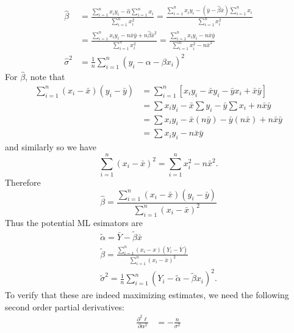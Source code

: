 \documentclass[notoc,notitlepage]{tufte-book}
\begin{document}
\begin{solution}
\begin{align*}
    \hat{\beta} &= \frac{\sum_{i=1}^{n} x_i y_i - \hat{\alpha} \sum_{i=1}^{n} x_i}{\sum_{i=1}^{n} x_i^2} = \frac{\sum_{i=1}^{n} x_i y_i - ( \bar{y} - \hat{\beta} \bar{x} ) \sum_{i=1}^{n} x_i}{\sum_{i=1}^{n} x_i^2} \\
                &= \frac{\sum_{i=1}^{n} x_i y_i - n \bar{x}\bar{y} + n \hat{\beta} \bar{x}^2}{\sum_{i=1}^{n} x_i^2} = \frac{\sum_{i=1}^{n} x_i y_i - n \bar{x}\bar{y}}{\sum_{i=1}^{n} x_i^2 - n \bar{x}^2} \\
    \hat{\sigma}^2 &= \frac{1}{n} \sum_{i=1}^{n} \left( y_i - \alpha - \beta x_i \right)^2
  \end{align*}
  For $\hat{\beta}$, note that
  \begin{align*}
    \sum_{i=1}^{n} (x_i - \bar{x})(y_i - \bar{y}) &= \sum_{i=1}^{n} \left[ x_i y_i - \bar{x} y_i - \bar{y} x_i + \bar{x}\bar{y} \right] \\
                                                  &= \sum x_i y_i - \bar{x} \sum y_i - \bar{y} \sum x_i + n \bar{x} \bar{y} \\
                                                  &= \sum x_i y_i - \bar{x} (n \bar{y}) - \bar{y} ( n \bar{x} ) + n \bar{x} \bar{y} \\
                                                  &= \sum x_i y_i - n \bar{x} \bar{y}
  \end{align*}
  and similarly so we have
  \begin{equation*}
    \sum_{i=1}^{n} (x_i - \bar{x})^2 = \sum_{i=1}^{n} x_i^2 - n \bar{x}^2.
  \end{equation*}
  Therefore
  \begin{equation*}
    \hat{\beta} = \frac{\sum_{i=1}^{n} (x_i - \bar{x})(y_i - \bar{y})}{\sum_{i=1}^{n} (x_i - \bar{x})^2}
  \end{equation*}
  Thus the potential ML esimators are
  \begin{gather*}
    \tilde{\alpha} = \bar{Y} - \tilde{\beta}\bar{x} \\
    \tilde{\beta} = \frac{\sum_{i=1}^{n} (x_i - x)(Y_i - \bar{Y})}{\sum_{i=1}^{n} (x_i - \bar{x})^2} \\
    \tilde{\sigma}^2 = \frac{1}{n} \sum_{i=1}^{n} \left( Y_i - \tilde{\alpha} - \tilde{\beta}x_i \right)^2.
  \end{gather*}
  To verify that these are indeed maximizing estimates, we need the following second order partial derivatives:
  \begin{align*}
    \frac{\partial^2 \ell}{\partial \alpha^2} &= - \frac{n}{\sigma^2} \\

\end{align*}
\end{solution}
\end{document}
